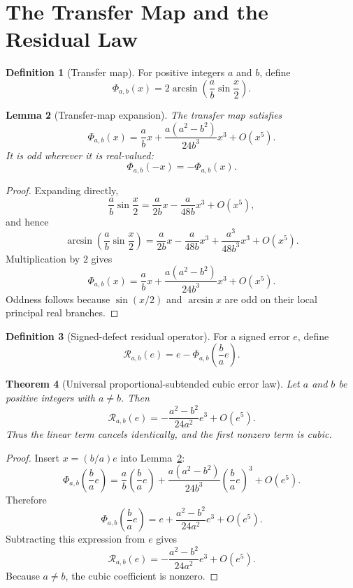 \documentclass[11pt]{article}
\newtheorem{theorem}{Theorem}[section]
\newtheorem{lemma}[theorem]{Lemma}
\theoremstyle{definition}
\newtheorem{definition}[theorem]{Definition}
\theoremstyle{remark}
\newcommand{\Rop}{\mathscr{R}}
\newcommand{\Phiop}{\Phi}
\begin{document}
\section{The Transfer Map and the Residual Law}
\label{sec:residual-law}

\begin{definition}[Transfer map]
For positive integers $a$ and $b$, define
\[
\Phiop_{a,b}(x)
=
2\arcsin\!\left(
\frac{a}{b}\sin\frac{x}{2}
\right).
\]
\end{definition}

\begin{lemma}[Transfer-map expansion]
\label{lem:transfer-expansion}
The transfer map satisfies
\[
\Phiop_{a,b}(x)
=
\frac{a}{b}x
+
\frac{a(a^2-b^2)}{24b^3}x^3
+
O(x^5).
\]
It is odd wherever it is real-valued:
\[
\Phiop_{a,b}(-x)=-\Phiop_{a,b}(x).
\]
\end{lemma}

\begin{proof}
Expanding directly,
\[
\frac{a}{b}\sin\frac{x}{2}
=
\frac{a}{2b}x
-
\frac{a}{48b}x^3
+
O(x^5),
\]
and hence
\[
\arcsin\!\left(
\frac{a}{b}\sin\frac{x}{2}
\right)
=
\frac{a}{2b}x
-
\frac{a}{48b}x^3
+
\frac{a^3}{48b^3}x^3
+
O(x^5).
\]
Multiplication by $2$ gives
\[
\Phiop_{a,b}(x)
=
\frac{a}{b}x
+
\frac{a(a^2-b^2)}{24b^3}x^3
+
O(x^5).
\]
Oddness follows because $\sin(x/2)$ and $\arcsin x$ are odd on their local
principal real branches.
\end{proof}

\begin{definition}[Signed-defect residual operator]
For a signed error $e$, define
\[
\Rop_{a,b}(e)
=
e-
\Phiop_{a,b}\!\left(\frac{b}{a}e\right).
\]
\end{definition}

\begin{theorem}[Universal proportional-subtended cubic error law]
\label{thm:universal-law}
Let $a$ and $b$ be positive integers with $a\ne b$.  Then
\[
\Rop_{a,b}(e)
=
-
\frac{a^2-b^2}{24a^2}e^3
+
O(e^5).
\]
Thus the linear term cancels identically, and the first nonzero term is cubic.
\end{theorem}

\begin{proof}
Insert $x=(b/a)e$ into Lemma~\ref{lem:transfer-expansion}:
\[
\Phiop_{a,b}\!\left(\frac{b}{a}e\right)
=
\frac{a}{b}\left(\frac{b}{a}e\right)
+
\frac{a(a^2-b^2)}{24b^3}
\left(\frac{b}{a}e\right)^3
+
O(e^5).
\]
Therefore
\[
\Phiop_{a,b}\!\left(\frac{b}{a}e\right)
=
e+
\frac{a^2-b^2}{24a^2}e^3
+
O(e^5).
\]
Subtracting this expression from $e$ gives
\[
\Rop_{a,b}(e)
=
-
\frac{a^2-b^2}{24a^2}e^3
+
O(e^5).
\]
Because $a\ne b$, the cubic coefficient is nonzero.
\end{proof}
\end{document}
